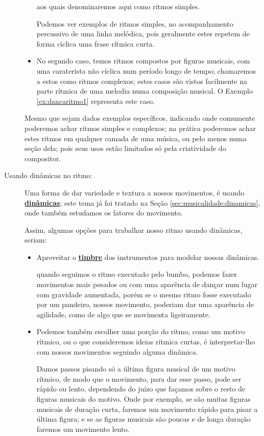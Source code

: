 \begin{description}
\begin{itemize}
aos quais denominaremos aqui como ritmos simples.
\begin{example}
 Podemos ver exemplos de ritmos simples,
no acompanhamento percussivo de uma linha melódica, 
pois geralmente estes repetem de forma cíclica uma frase rítmica curta.
\end{example}
\item No segundo caso, temos  ritmos compostos por figuras musicais,
com uma caraterista não cíclica num período longo de tempo; 
chamaremos a estos como ritmos complexos;
estes casos são vistos facilmente na parte rítmica de uma melodia numa composição musical.
O Exemplo \ref{ex:dancaritmo1} representa este caso.
\end{itemize}
Mesmo que sejam dados exemplos específicos, 
indicando onde comumente poderemos achar ritmos simples e complexos;
na prática poderemos achar estes ritmos em qualquer camada de uma música,
ou pelo menos numa seção dela; 
pois seus usos estão limitados só pela criatividade do compositor.
\item [Usando dinâmicas no ritmo:] 
Uma forma de dar variedade e textura a nossos movimentos, 
é usando \hyperref[sec:musicalidade:dinamicas]{\textbf{dinâmicas}}; este tema já foi tratado na Seção \ref{sec:musicalidade:dinamicas},
onde também estudamos os fatores do movimento.

Assim, algumas opções para trabalhar nosso ritmo usando dinâmicas, seriam:
\begin{itemize}
\item Aproveitar o \hyperref[sec:pos:timbre]{\textbf{timbre}} dos instrumentos para modelar nossas dinâmicas.
\begin{example}
\label{ex:danceritmo:bumbopandeiro}
quando seguimos  o ritmo executado pelo bumbo,
podemos fazer movimentos mais pesados ou com uma aparência de dançar num lugar com gravidade aumentada,
porém se o mesmo ritmo fosse executado por um pandeiro,
nossos movimento,
poderiam dar uma aparência de agilidade, 
como de algo que se movimenta ligeiramente.
\end{example}
\item Podemos também escolher uma porção do ritmo, como um motivo rítmico,
 ou o que consideremos ideias rítmica curtas,
é interpretar-lho com nossos movimentos seguindo alguma dinâmica.
\begin{example}
Damos passos pisando só a última figura musical de um motivo rítmico,
de modo que o movimento, para dar esse passo, pode ser rápido ou lento,
dependendo do juízo que façamos sobre o resto de figuras musicais do motivo.
Onde por exemplo, se são muitas figuras musicais de duração curta, 
faremos um movimento rápido para pisar a última figura;
e se as figuras musicais são poucas e de longa duração faremos um movimento lento.
\end{example}
\end{itemize}
\end{description}

